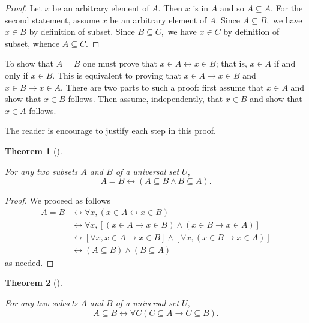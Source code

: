 \documentclass[
  letterpaper,
  10pt,
  reqno,
  twopage,
  openany]{book}
\theoremstyle{plain}
\theoremstyle{definition}
\theoremstyle{definition}
\theoremstyle{definition}
\theoremstyle{plain}
\theoremstyle{plain}
\newtheorem{theorem}{Theorem}[chapter]
\theoremstyle{remark}
\begin{document}
\begin{proof}

Let \(x\) be an arbitrary element of \(A.\) Then \(x\) is in \(A\) and
so \(A\subseteq A.\) For the second statement, assume \(x\) be an
arbitrary element of \(A.\) Since \(A\subseteq B,\) we have \(x\in B\)
by definition of subset. Since \(B\subseteq C,\) we have \(x\in C\) by
definition of subset, whence \(A\subseteq C.\)

\end{proof}

To show that \(A=B\) one must prove that
\(x\in A\leftrightarrow x\in B\); that is, \(x\in A\) if and only if
\(x\in B.\) This is equivalent to proving that
\(x\in A\rightarrow x\in B\) and \(x\in B\rightarrow x\in A.\) There are
two parts to such a proof: first assume that \(x\in A\) and show that
\(x\in B\) follows. Then assume, independently, that \(x\in B\) and show
that \(x\in A\) follows.

The reader is encourage to justify each step in this proof.

\leavevmode{}%
\begin{theorem}[]\label{thm-universal}

For any two subsets \(A\) and \(B\) of a universal set \(U,\)
\begin{equation}
\label{eqsetsone}
A=B \leftrightarrow (A\subseteq B \land B\subseteq A).
\end{equation}

\end{theorem}

\begin{proof}

We proceed as follows \begin{align*}
A=B & \leftrightarrow 
\forall x, (x\in A \leftrightarrow x\in B) \\
& \leftrightarrow 
\forall x, [(x\in A\rightarrow x\in B)\land (x\in B\rightarrow x\in A)] \\
& \leftrightarrow [\forall x, x\in A \rightarrow x\in B]\land [\forall x, (x\in B\rightarrow x\in A)]\\
& \leftrightarrow (A\subseteq B) \land (B\subseteq A)
\end{align*} as needed.

\end{proof}

\leavevmode{}%
\begin{theorem}[]\label{thm-subsetsmean}

For any two subsets \(A\) and \(B\) of a universal set \(U,\)
\begin{equation}
\label{subsetsmean}
A\subseteq B \leftrightarrow \forall C (C\subseteq A \rightarrow C\subseteq B).
\end{equation}

\end{theorem}
\end{document}
